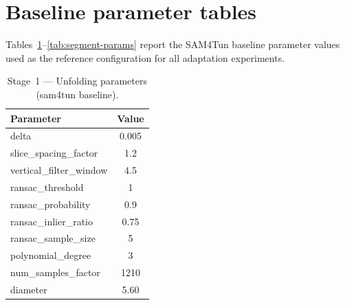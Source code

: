 
\FloatBarrier
\setcounter{section}{0}
\renewcommand{\thesection}{\arabic{section}}
\renewcommand{\thesubsection}{\thesection.\arabic{subsection}}

\section{Baseline parameter tables}\label{app:params}
Tables~\ref{tab:unfold-params}--\ref{tab:segment-params} report the SAM4Tun baseline parameter values used as the reference configuration for all adaptation experiments.

\begin{table}[ht]
\caption{Stage~1 --- Unfolding parameters (sam4tun baseline).}\label{tab:unfold-params}
\begin{tabular*}{\tblwidth}{@{} l c @{}}
\toprule
Parameter & Value \\
\midrule
delta & 0.005 \\
slice\_spacing\_factor & 1.2 \\
vertical\_filter\_window & 4.5 \\
ransac\_threshold & 1 \\
ransac\_probability & 0.9 \\
ransac\_inlier\_ratio & 0.75 \\
ransac\_sample\_size & 5 \\
polynomial\_degree & 3 \\
num\_samples\_factor & 1210 \\
diameter & 5.60 \\
\bottomrule
\end{tabular*}
\end{table}

